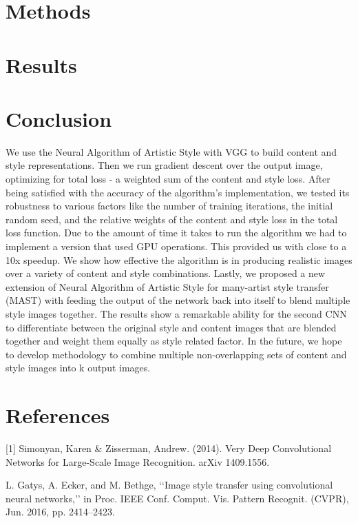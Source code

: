 \documentclass{article}
\begin{document}
\section{Methods}

\section{Results}

\section{Conclusion}

We use the Neural Algorithm of Artistic Style with VGG to build content and style representations. Then we run gradient descent over the output image, optimizing for total loss - a weighted sum of the content and style loss. After being satisfied with the accuracy of the algorithm's implementation, we tested its robustness to various factors like the number of training iterations, the initial random seed, and the relative weights of the content and style loss in the total loss function. Due to the amount of time it takes to run the algorithm we had to implement a version that used GPU operations. This provided us with close to a 10x speedup. We show how effective the algorithm is in producing realistic images over a variety of content and style combinations. Lastly, we proposed a new extension of Neural Algorithm of Artistic Style for many-artist style transfer (MAST) with feeding the output of the network back into itself to blend multiple style images together. The results show a remarkable ability for the second CNN to differentiate between the original style and content images that are blended together and weight them equally as style related factor. In the future, we hope to develop methodology to combine multiple non-overlapping sets of content and style images into k output images.

\section*{References}

[1] Simonyan, Karen \& Zisserman, Andrew. (2014). Very Deep Convolutional Networks for Large-Scale Image Recognition. arXiv 1409.1556.

\noindent [2] L. Gatys, A. Ecker, and M. Bethge, ‘‘Image style transfer using convolutional neural networks,’’ in Proc. IEEE Conf. Comput. Vis. Pattern Recognit. (CVPR), Jun. 2016, pp. 2414–2423.
\end{document}
